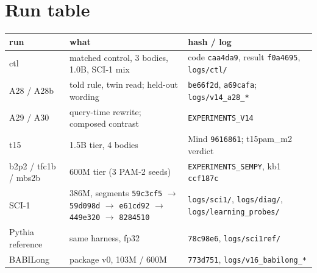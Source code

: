 \documentclass[11pt]{article}
\newcommand{\arch}{PAM-2}
\newcommand{\scione}{SCI-1}
\begin{document}
\section{Run table}
\label{app:runs}
\small
\begin{tabular}{lll}
\toprule
run & what & hash / log \\
\midrule
ctl & matched control, 3 bodies, 1.0B, \scione{} mix & code \texttt{caa4da9}, result \texttt{f0a4695}, \texttt{logs/ctl/} \\
A28 / A28b & told rule, twin read; held-out wording & \texttt{be66f2d}, \texttt{a69cafa}; \texttt{logs/v14\_a28\_*} \\
A29 / A30 & query-time rewrite; composed contrast & \texttt{EXPERIMENTS\_V14} \\
t15 & 1.5B tier, 4 bodies & Mind \texttt{9616861}; t15pam\_m2 verdict \\
b2p2 / tfc1b / mbs2b & 600M tier (3 \arch{} seeds) & \texttt{EXPERIMENTS\_SEMPY}, kb1 \texttt{ccf187c} \\
\scione{} & 386M, segments \texttt{59c3cf5} $\to$ \texttt{59d098d} $\to$ \texttt{e61cd92} $\to$ \texttt{449e320} $\to$ \texttt{8284510} & \texttt{logs/sci1/}, \texttt{logs/diag/}, \texttt{logs/learning\_probes/} \\
Pythia reference & same harness, fp32 & \texttt{78c98e6}, \texttt{logs/sci1ref/} \\
BABILong & package v0, 103M / 600M & \texttt{773d751}, \texttt{logs/v16\_babilong\_*} \\
\bottomrule
\end{tabular}
\end{document}
